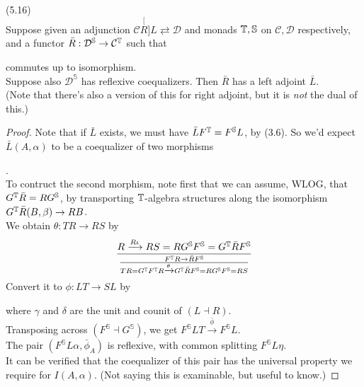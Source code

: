 \documentclass[a4paper]{article}
\begin{document}
\begin{thm} (5.16)\\
    Suppose given an adjunction $\mathcal{C} \stackrel[R]{L}{\rightleftarrows} \mathcal{D}$ and monads $\mathbb{T},\mathbb{S}$ on $\mathcal{C},\mathcal{D}$ respectively, and a functor $\bar{R}:\mathcal{D}^\mathbb{S} \to \mathcal{C}^{\mathbb{T}}$ such that 
    commutes up to isomorphism.\\
    Suppose also $\mathcal{D}^\mathbb{S}$ has reflexive coequalizers. Then $\bar{R}$ has a left adjoint $\bar{L}$.\\
    (Note that there's also a version of this for right adjoint, but it is \emph{not} the dual of this.)
    \begin{proof}
        Note that if $\bar{L}$ exists, we must have $\bar{L} F^{\mathbb{T}} = F^\mathbb{S} L$, by (3.6). So we'd expect $\bar{L}(A,\alpha)$ to be a coequalizer of two morphisms
        .\\
        To contruct the second morphism, note first that we can assume, WLOG, that $G^{\mathbb{T}} \bar{R} = RG^\mathbb{S}$, by transporting $\mathbb{T}$-algebra structures along the isomorphism $G^{\mathbb{T}} \bar{R} (B,\beta) \to RB$.\\
        We obtain $\theta:TR \to RS$ by 
        \begin{equation*}
            \begin{aligned}
                \frac{R \xrightarrow{R\iota} RS = RG^\mathbb{S} F^\mathbb{S} = G^{\mathbb{T}} \bar{R} F^\mathbb{S}}{\frac{F^{\mathbb{T}} R \to \bar{R} F^\mathbb{S}}{TR = G^{\mathbb{T}} F^{\mathbb{T}} R \xrightarrow{\theta} G^{\mathbb{T}} \bar{R} F^\mathbb{S} = RG^\mathbb{S} F^\mathbb{S} = RS}}
            \end{aligned}
        \end{equation*}
        Convert it to $\phi:LT \to SL$ by
        where $\gamma$ and $\delta$ are the unit and counit of $(L\dashv R)$.\\
        Transposing across $(F^\mathbb{S} \dashv G^\mathbb{S})$, we get $F^\mathbb{S} LT \xrightarrow{\bar{\phi}} F^\mathbb{S}L$.\\
        The pair $(F^\mathbb{S} L\alpha,\bar{\phi}_A)$ is reflexive, with common splitting $F^\mathbb{S} L\eta$.\\
        It can be verified that the coequalizer of this pair has the universal property we require for $I(A,\alpha)$. (Not saying this is examinable, but useful to know.)
    \end{proof}
\end{thm}
\end{document}
